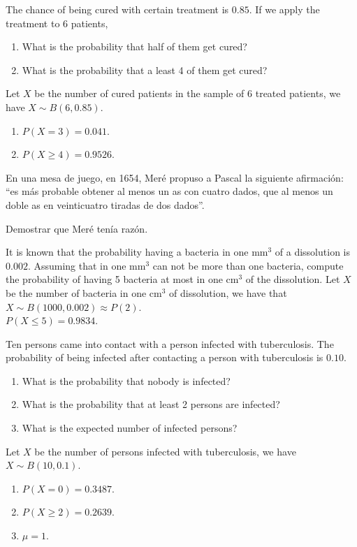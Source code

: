 {The chance of being cured with certain treatment is $0.85$. 
If we apply the treatment to 6 patients,
\begin{enumerate}
\item What is the probability that half of them get cured?
\item What is the probability that a least 4 of them get cured?
\end{enumerate}
}
{Let $X$ be the number of cured patients in the sample of 6 treated patients, we have $X\sim B(6,0.85)$.
\begin{enumerate}
\item $P(X=3)=0.041$.
\item $P(X\geq 4)=0.9526$.
\end{enumerate}
}
{}


{En una mesa de juego, en 1654, Meré propuso a Pascal la siguiente afirmación: ``es más probable obtener al menos un as con cuatro dados, que al menos un doble as en veinticuatro tiradas de dos dados''.

Demostrar que Meré tenía razón.
}
{}
{}


{It is known that the probability having a bacteria in one mm$^3$ of a dissolution is $0.002$.
Assuming that in one mm$^3$ can not be more than one bacteria, compute the probability of having 5 bacteria at most in one cm$^3$ of the dissolution.}
{Let $X$ be the number of bacteria in one cm$^3$ of dissolution, we have that $X\sim B(1000,0.002)\approx P(2)$.\\
$P(X\leq 5)=0.9834$.
}
{}


{Ten persons came into contact with a person infected with tuberculosis. 
The probability of being infected after contacting a person with tuberculosis is $0.10$.
\begin{enumerate}
\item What is the probability that nobody is infected?
\item What is the probability that at least 2 persons are infected?
\item What is the expected number of infected persons? 
\end{enumerate}
}
{Let $X$ be the number of persons infected with tuberculosis, we have $X\sim B(10,0.1)$. 
\begin{enumerate}
\item $P(X=0)=0.3487$. 
\item $P(X\geq 2)=0.2639$.
\item $\mu=1$.
\end{enumerate}
}
{}


